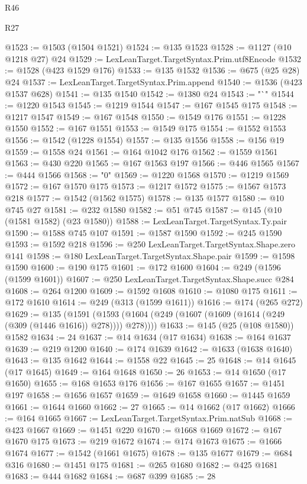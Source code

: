 \begin{lexlean}{R46}
\begin{lexlean}{R27}
\begin{coremodule}
{{{{{{{{{{{{{{{{{{{{{{{{{{{{{{{{{{{{{{{{{{{{{{{{{{{{{{{{{{{{{{@1523 := @1503 (@1504 @1521)
@1524 := @135 @1523
@1528 := @1127 (@10 @1218 @27) @24
@1529 := LexLeanTarget.TargetSyntax.Prim.utf8Encode
@1532 := @1528 (@423 @1529 @176)
@1533 := @135 @1532
@1536 := @675 (@25 @28) @24
@1537 := LexLeanTarget.TargetSyntax.Prim.append
@1540 := @1536 (@423 @1537 @628)
@1541 := @135 @1540
@1542 := @1380 @24
@1543 := "`"
@1544 := @1220 @1543
@1545 := @1219 @1544
@1547 := @167 @1545 @175
@1548 := @1217 @1547
@1549 := @167 @1548
@1550 := @1549 @176
@1551 := @1228 @1550
@1552 := @167 @1551
@1553 := @1549 @175
@1554 := @1552 @1553
@1556 := @1542 (@1228 @1554)
@1557 := @135 @1556
@1558 := @156 @19
@1559 := @1558 @24
@1561 := @164 @1042 @176
@1562 := @1559 @1561
@1563 := @430 @220
@1565 := @167 @1563 @197
@1566 := @446 @1565
@1567 := @444 @1566
@1568 := "0"
@1569 := @1220 @1568
@1570 := @1219 @1569
@1572 := @167 @1570 @175
@1573 := @1217 @1572
@1575 := @1567 @1573 @218
@1577 := @1542 (@1562 @1575)
@1578 := @135 @1577
@1580 := @10 @745 @27
@1581 := @232 @1580
@1582 := @51 @745
@1587 := @145 (@10 (@1581 @1582) (@23 @1580))
@1588 := LexLeanTarget.TargetSyntax.Ty.pair
@1590 := @1588 @745 @107
@1591 := @1587 @1590
@1592 := @245 @1590
@1593 := @1592 @218
@1596 := @250 LexLeanTarget.TargetSyntax.Shape.zero @141
@1598 := @180 LexLeanTarget.TargetSyntax.Shape.pair
@1599 := @1598 @1590
@1600 := @190 @175
@1601 := @172 @1600
@1604 := @249 (@1596 (@1599 @1601))
@1607 := @250 LexLeanTarget.TargetSyntax.Shape.succ @284
@1608 := @264 @1200
@1609 := @1592 @1608
@1610 := @1080 @175
@1611 := @172 @1610
@1614 := @249 (@313 (@1599 @1611))
@1616 := @174 (@265 @272)
@1629 := @135
    (@1591 (@1593 (@1604 (@249 (@1607 (@1609 (@1614 (@249 (@309 (@1446 @1616)) @278)))) @278))))
@1633 := @145 (@25 (@108 @1580)) @1582
@1634 := 24
@1637 := @14 @1634 (@17 @1634)
@1638 := @164 @1637
@1639 := @219 @1200
@1640 := @174 @1639
@1642 := @1633 (@1638 @1640)
@1643 := @135 @1642
@1644 := @1558 @22
@1645 := 25
@1648 := @14 @1645 (@17 @1645)
@1649 := @164 @1648
@1650 := 26
@1653 := @14 @1650 (@17 @1650)
@1655 := @168 @1653 @176
@1656 := @167 @1655
@1657 := @1451 @197
@1658 := @1656 @1657
@1659 := @1649 @1658
@1660 := @1445 @1659
@1661 := @1644 @1660
@1662 := 27
@1665 := @14 @1662 (@17 @1662)
@1666 := @164 @1665
@1667 := LexLeanTarget.TargetSyntax.Prim.natSub
@1668 := @423 @1667
@1669 := @1451 @220
@1670 := @1668 @1669
@1672 := @167 @1670 @175
@1673 := @219 @1672
@1674 := @174 @1673
@1675 := @1666 @1674
@1677 := @1542 (@1661 @1675)
@1678 := @135 @1677
@1679 := @684 @316
@1680 := @1451 @175
@1681 := @265 @1680
@1682 := @425 @1681
@1683 := @444 @1682
@1684 := @687 @399
@1685 := 28
}}}}}}}}}}}}}}}}}}}}}}}}}}}}}}}}}}}}}}}}}}}}}}}}}}}}}}}}}}}}}}
\end{coremodule}
\end{lexlean}
\end{lexlean}
